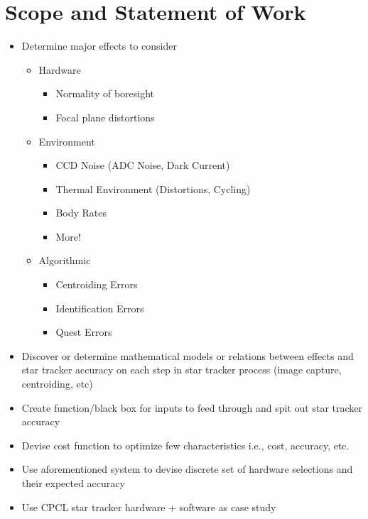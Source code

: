 \section{Scope and Statement of Work}
\begin{itemize}
    \item Determine major effects to consider
    \begin{itemize}
        \item Hardware
        \begin{itemize}
            \item Normality of boresight
            \item Focal plane distortions
        \end{itemize}
        
        \item Environment
        \begin{itemize}
        \item CCD Noise (ADC Noise, Dark Current)
        \item Thermal Environment (Distortions, Cycling)
        \item Body Rates
        \item More!
        \end{itemize}

        \item Algorithmic
        \begin{itemize}
            \item Centroiding Errors 
            \item Identification Errors 
            \item Quest Errors 
        \end{itemize}
    \end{itemize}
    \item Discover or determine mathematical models or relations between effects and star tracker accuracy on each step in star tracker process (image capture, centroiding, etc)
    \item Create function/black box for inputs to feed through and spit out star tracker accuracy 
    \item Devise cost function to optimize few characteristics i.e., cost, accuracy, etc.
    \item Use aforementioned system to devise discrete set of hardware selections and their expected accuracy 
    \item Use CPCL star tracker hardware + software as case study
\end{itemize}

